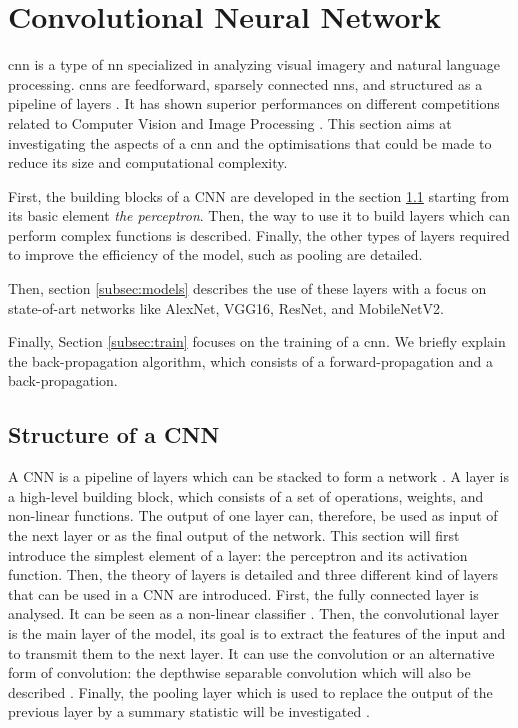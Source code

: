 \section{Convolutional Neural Network} \label{sec:cnn}
\acrshort{cnn} is a type of \acrshort{nn} specialized in analyzing visual imagery and natural language processing. \acrshort{cnn}s are feedforward, sparsely connected \acrshort{nn}s, and structured as a pipeline of layers \cite{abdelouahab_accelerating_2018}. It has shown superior performances on different competitions related to Computer Vision and Image Processing \cite{khan_survey_2020}. This section aims at investigating the aspects of a \acrshort{cnn} and the optimisations that could be made to reduce its size and computational complexity.

First, the building blocks of a CNN are developed in the section \ref{subsec:layer} starting from its basic element \textit{the perceptron}. Then, the way to use it to build layers which can perform complex functions is described. Finally, the other types of layers required to improve the efficiency of the model, such as pooling are detailed.

Then, section \ref{subsec:models} describes the use of these layers with a focus on state-of-art networks like AlexNet, VGG16, ResNet, and MobileNetV2.

Finally, Section \ref{subsec:train} focuses on the training of a \acrshort{cnn}. We briefly explain the back-propagation algorithm, which consists of a forward-propagation and a back-propagation.
%
%
\subsection{Structure of a CNN} \label{subsec:layer}
A CNN is a pipeline of layers which can be stacked to form a network \cite{abdelouahab_accelerating_2018}. A layer is a high-level building block, which consists of a set of operations, weights, and non-linear functions. The output of one layer can, therefore, be used as input of the next layer or as the final output of the network. This section will first introduce the simplest element of a layer: the perceptron and its activation function. Then, the theory of layers is detailed and three different kind of layers that can be used in a CNN are introduced.
First, the fully connected layer is analysed. It can be seen as a non-linear classifier \cite{khan_survey_2020}. Then, the convolutional layer is the main layer of the model, its goal is to extract the features of the input and to transmit them to the next layer. It can use the convolution or an alternative form of convolution: the depthwise separable convolution which will also be described \cite{liu_fpga-based_2019}. Finally, the pooling layer which is used to replace the output of the previous layer by a summary statistic will be investigated \cite{goodfellow_deep_2016}.
%
%

%

%

%

%

%


